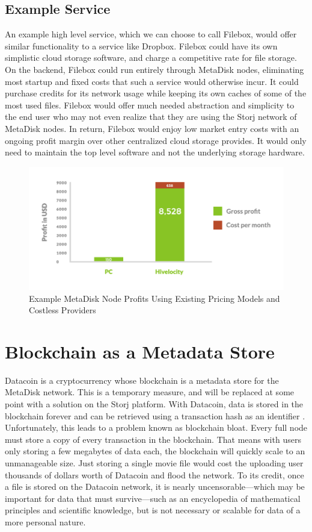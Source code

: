 \documentclass[a4paper,10pt]{article}
\begin{document}
\subsection{Example Service}
An example high level service, which we can choose to call Filebox, would offer similar functionality to a service like Dropbox. Filebox could have its own simplistic cloud storage software, and charge a competitive rate for file storage. On the backend, Filebox could run entirely through MetaDisk nodes, eliminating most startup and fixed costs that such a service would otherwise incur. It could purchase credits for its network usage while keeping its own caches of some of the most used files. Filebox would offer much needed abstraction and simplicity to the end user who may not even realize that they are using the Storj network of MetaDisk nodes. In return, Filebox would enjoy low market entry costs with an ongoing profit margin over other centralized cloud storage provides. It would only need to maintain the top level software and not the underlying storage hardware.


\begin{figure}[h!]
  \centering
      \includegraphics[width=\linewidth]{05}
  \caption{Example MetaDisk Node Profits Using Existing Pricing Models and Costless Providers}
\end{figure}


\section{Blockchain as a Metadata Store}

Datacoin \cite{11} is a cryptocurrency whose blockchain is a metadata store for the MetaDisk network. This is a temporary measure, and will be replaced at some point with a solution on the Storj platform.  With Datacoin, data is stored in the blockchain forever and can be retrieved using a transaction hash as an identifier \cite{11}. Unfortunately, this leads to a problem known as blockchain bloat. Every full node must store a copy of every transaction in the blockchain. That means with users only storing a few megabytes of data each, the blockchain will quickly scale to an unmanageable size. Just storing a single movie file would cost the uploading user thousands of dollars worth of Datacoin and flood the network. To its credit, once a file is stored on the Datacoin network, it is nearly uncensorable—which may be important for data that must survive—such as an encyclopedia of mathematical principles and scientific knowledge, but is not necessary or scalable for data of a more personal nature.
\end{document}
